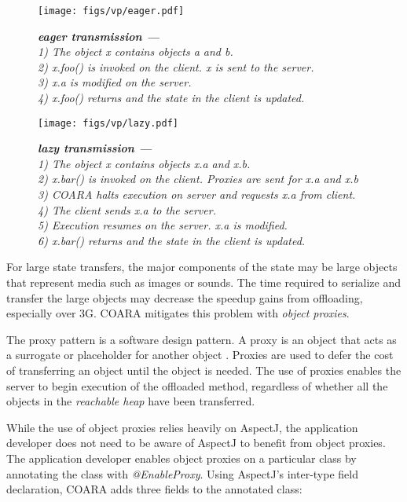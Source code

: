 \documentclass[10pt,journal,cspaper,compsoc]{IEEEtran}
\begin{document}
\begin{figure}
\texttt{[image: figs/vp/eager.pdf]}
\caption{\small\textsl{\textbf{eager transmission ---} \\
 1) The object x contains objects a and b.\\
 2) x.foo() is invoked on the client.  x is sent to the server.\\
 3) x.a is modified on the server.\\
 4) x.foo() returns and the state in the client is updated.}}
\label{fig:eager}
\end{figure}


\begin{figure}
\vspace*{-0.6cm}
\texttt{[image: figs/vp/lazy.pdf]}
\captionsetup{width=9cm}
\caption{\small\textsl{\textbf{lazy transmission ---} \\
 1) The object x contains objects x.a and x.b.  \\
 2) x.bar() is invoked on the client.  Proxies are sent for x.a and x.b\\
 3) COARA halts execution on server and requests x.a from client.\\
 4) The client sends x.a to the server.\\
 5) Execution resumes on the server.  x.a is modified.\\
 6) x.bar() returns and the state in the client is updated.}}
\label{fig:lazy}
\end{figure}

For large state transfers, the major components of the state may be large objects that represent media such as images or sounds.  The time required to serialize and transfer the large objects may decrease the speedup gains from offloading, especially over 3G.  COARA mitigates this problem with \emph{object proxies}.


The proxy pattern is a software design pattern.  A proxy is an object that acts as a surrogate or placeholder for another object \cite{DesignPatterns:1995wx}. Proxies are used to defer the cost of transferring an object until the object is needed.  The use of proxies enables the server to begin execution of the offloaded method, regardless of whether all the objects in the \emph{reachable heap} have been transferred.

While the use of object proxies relies heavily on AspectJ, the application developer does not need to be aware of AspectJ to benefit from object proxies.
The application developer enables object proxies on a particular class by annotating the class with \emph{@EnableProxy}. Using AspectJ's inter-type field declaration, COARA adds three fields to the annotated class:
\end{document}
